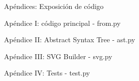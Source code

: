 \begin{section}{Ap\'endices: Exposici\'on de c\'odigo}

\begin{subsection}{Ap\'endice I: c\'odigo principal - from.py}

	

\end{subsection}

\begin{subsection}{Ap\'endice II: Abstract Syntax Tree - ast.py}

	

\end{subsection}

\begin{subsection}{Ap\'endice III: SVG Builder - svg.py}

	

\end{subsection}

\begin{subsection}{Ap\'endice IV: Tests - test.py}

	
	

\end{subsection}

\end{section}